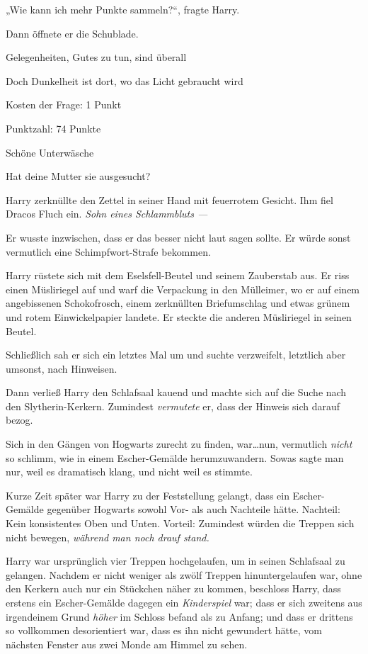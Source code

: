 {„Wie kann ich mehr Punkte sammeln?“, fragte Harry.

Dann öffnete er die Schublade.

Gelegenheiten, Gutes zu tun, sind überall

Doch Dunkelheit ist dort, wo das Licht gebraucht wird

Kosten der Frage: 1 Punkt

Punktzahl: 74 Punkte

Schöne Unterwäsche

Hat deine Mutter sie ausgesucht?

Harry zerknüllte den Zettel in seiner Hand mit feuerrotem Gesicht. Ihm fiel Dracos Fluch ein. \emph{Sohn eines Schlammbluts —}

Er wusste inzwischen, dass er das besser nicht laut sagen sollte. Er würde sonst vermutlich eine Schimpfwort-Strafe bekommen.

Harry rüstete sich mit dem Eselsfell-Beutel und seinem Zauberstab aus. Er riss einen Müsliriegel auf und warf die Verpackung in den Mülleimer, wo er auf einem angebissenen Schokofrosch, einem zerknüllten Briefumschlag und etwas grünem und rotem Einwickelpapier landete. Er steckte die anderen Müsliriegel in seinen Beutel.

Schließlich sah er sich ein letztes Mal um und suchte verzweifelt, letztlich aber umsonst, nach Hinweisen.

Dann verließ Harry den Schlafsaal kauend und machte sich auf die Suche nach den Slytherin-Kerkern. Zumindest \emph{vermutete} er, dass der Hinweis sich darauf bezog.

Sich in den Gängen von Hogwarts zurecht zu finden, war…nun, vermutlich \emph{nicht} so schlimm, wie in einem Escher-Gemälde herumzuwandern. Sowas sagte man nur, weil es dramatisch klang, und nicht weil es stimmte.

Kurze Zeit später war Harry zu der Feststellung gelangt, dass ein Escher-Gemälde gegenüber Hogwarts sowohl Vor- als auch Nachteile hätte. Nachteil: Kein konsistentes Oben und Unten. Vorteil: Zumindest würden die Treppen sich nicht bewegen, \emph{während man noch drauf stand.}

Harry war ursprünglich vier Treppen hochgelaufen, um in seinen Schlafsaal zu gelangen. Nachdem er nicht weniger als zwölf Treppen hinuntergelaufen war, ohne den Kerkern auch nur ein Stückchen näher zu kommen, beschloss Harry, dass erstens ein Escher-Gemälde dagegen ein \emph{Kinderspiel} war; dass er sich zweitens aus irgendeinem Grund \emph{höher} im Schloss befand als zu Anfang; und dass er drittens so vollkommen desorientiert war, dass es ihn nicht gewundert hätte, vom nächsten Fenster aus zwei Monde am Himmel zu sehen.

}
